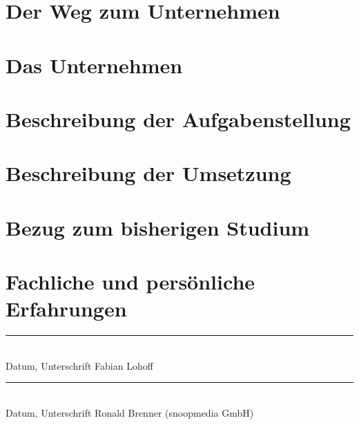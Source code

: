 \documentclass[
  11pt,
  a4paper,
  oneside,
  titlepage,
  numbers=noenddot
]{scrartcl}
\begin{document}
\section{Der Weg zum Unternehmen}


\section{Das Unternehmen}


\section{Beschreibung der Aufgabenstellung}


\clearpage
\section{Beschreibung der Umsetzung}


\section{Bezug zum bisherigen Studium}


\section{Fachliche und persönliche Erfahrungen}


\vspace{3cm} %

\noindent
\begin{minipage}[t]{0.45\textwidth}
    \centering
    \rule{\textwidth}{0.4pt}\\
    Datum, Unterschrift Fabian Lohoff
\end{minipage}
\hfill
\begin{minipage}[t]{0.45\textwidth}
    \centering
    \rule{\textwidth}{0.4pt}\\
    Datum, Unterschrift Ronald Brenner (snoopmedia GmbH)
\end{minipage}

\clearpage
\appendix

\printbibliography[heading=bibintoc, title={Literaturverzeichnis}]
\end{document}

